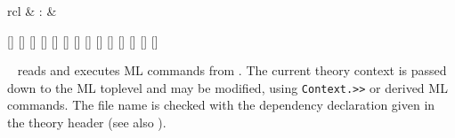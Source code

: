 \begin{isabellebody}
\begin{isamarkuptext}
\begin{matharray}{rcl}
    \hypertarget{command.attribute-setup}{\hyperlink{command.attribute-setup}{\mbox{}}} & : &  \\
  \end{matharray}

  \begin{railoutput}
[]
[]
\rail@end
{}
\rail@bar
{}[]
[]
[]
[]
[]
[]
\rail@endbar
{}[]
\rail@end
{}
[]
[]
[]
[]
[]
\rail@end
\end{railoutput}


  \begin{description}

  \item \hyperlink{command.use}{\mbox{}}~ reads and executes ML
  commands from .  The current theory context is passed
  down to the ML toplevel and may be modified, using \verb|Context.>>| or derived ML commands.  The file name is checked with
  the \hyperlink{keyword.uses}{\mbox{}} dependency declaration given in the theory
  header (see also ).


\end{description}
\end{isamarkuptext}
\end{isabellebody}
